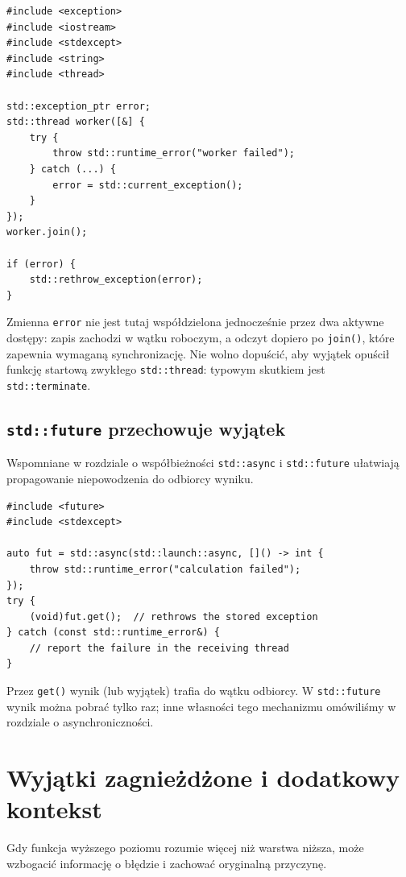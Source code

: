 \begin{lstlisting}
#include <exception>
#include <iostream>
#include <stdexcept>
#include <string>
#include <thread>

std::exception_ptr error;
std::thread worker([&] {
    try {
        throw std::runtime_error("worker failed");
    } catch (...) {
        error = std::current_exception();
    }
});
worker.join();

if (error) {
    std::rethrow_exception(error);
}
\end{lstlisting}

Zmienna \texttt{error} nie jest tutaj współdzielona jednocześnie przez
dwa aktywne dostępy: zapis zachodzi w wątku roboczym, a odczyt
dopiero po \texttt{join()}, które zapewnia wymaganą synchronizację.
Nie wolno dopuścić, aby wyjątek opuścił funkcję startową zwykłego
\texttt{std::thread}: typowym skutkiem jest \texttt{std::terminate}.

\subsection{\texttt{std::future} przechowuje wyjątek}

Wspomniane w rozdziale o współbieżności \texttt{std::async} i
\texttt{std::future} ułatwiają propagowanie niepowodzenia do
odbiorcy wyniku.

\begin{lstlisting}
#include <future>
#include <stdexcept>

auto fut = std::async(std::launch::async, []() -> int {
    throw std::runtime_error("calculation failed");
});
try {
    (void)fut.get();  // rethrows the stored exception
} catch (const std::runtime_error&) {
    // report the failure in the receiving thread
}
\end{lstlisting}

Przez \texttt{get()} wynik (lub wyjątek) trafia do wątku odbiorcy.
W \texttt{std::future} wynik można pobrać tylko raz; inne własności
tego mechanizmu omówiliśmy w rozdziale o asynchroniczności.

\section{Wyjątki zagnieżdżone i dodatkowy kontekst}
\label{sec:cpp11-nested}

Gdy funkcja wyższego poziomu rozumie więcej niż warstwa niższa, może
wzbogacić informację o błędzie i zachować oryginalną przyczynę.

